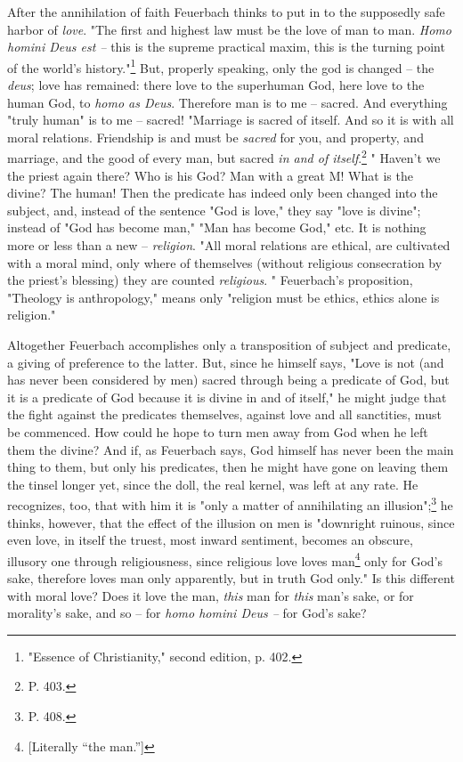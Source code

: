 After the annihilation of faith Feuerbach thinks to put in to the supposedly 
safe harbor of \textit{love}. "{}The first and highest law must be the love of 
man to man. \textit{Homo homini Deus est --} this is the supreme practical 
maxim, this is the turning point of the world's 
history."{}\footnote{"{}Essence of Christianity,"{} second edition, p. 402.} 
But, properly speaking, only the god is changed -- the \textit{deus}; love has 
remained: there love to the superhuman God, here love to the human God, to 
\textit{homo as Deus}. Therefore man is to me -- sacred. And everything 
"{}truly human"{} is to me -- sacred! "{}Marriage is sacred of itself. And so 
it is with all moral relations. Friendship is and must be \textit{sacred} for 
you, and property, and marriage, and the good of every man, but sacred 
\textit{in and of itself}.\footnote{P. 403.} "{} Haven't we the priest again 
there? Who is his God? Man with a great M! What is the divine? The human! Then 
the predicate has indeed only been changed into the subject, and, instead of 
the sentence "{}God is love,"{} they say "{}love is divine"{}; instead of 
"{}God has become man,"{} "{}Man has become God,"{} etc. It is nothing more or 
less than a new -- \textit{religion}. "{}All moral relations are ethical, are 
cultivated with a moral mind, only where of themselves (without religious 
consecration by the priest's blessing) they are counted \textit{religious}. 
"{} Feuerbach's proposition, "{}Theology is anthropology,"{} means only 
"{}religion must be ethics, ethics alone is religion."{}

Altogether Feuerbach accomplishes only a transposition of subject and 
predicate, a giving of preference to the latter. But, since he himself says, 
"{}Love is not (and has never been considered by men) sacred through being a 
predicate of God, but it is a predicate of God because it is divine in and of 
itself,"{} he might judge that the fight against the predicates themselves, 
against love and all sanctities, must be commenced. How could he hope to turn 
men away from God when he left them the divine? And if, as Feuerbach says, God 
himself has never been the main thing to them, but only his predicates, then 
he might have gone on leaving them the tinsel longer yet, since the doll, the 
real kernel, was left at any rate. He recognizes, too, that with him it is 
"{}only a matter of annihilating an illusion"{};\footnote{P. 408.} he thinks, 
however, that the effect of the illusion on men is "{}downright ruinous, since 
even love, in itself the truest, most inward sentiment, becomes an obscure, 
illusory one through religiousness, since religious love loves 
man\footnote{[Literally ``the man.'']} only for God's sake, therefore loves 
man only apparently, but in truth God only."{} Is this different with moral 
love? Does it love the man, \textit{this} man for \textit{this} man's sake, or 
for morality's sake, and so -- for \textit{homo homini Deus --} for God's 
sake?

